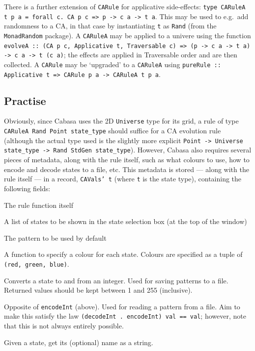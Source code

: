 \documentclass[oneside,a4paper]{memoir}
\begin{document}
There is a further extension of \texttt{CARule} for applicative side-effects:
  \texttt{type CARuleA t p a = forall c. CA p c => p -> c a -> t a}.
This may be used to e.g.\ add randomness to a CA,
  in that case by instantiating \texttt{t} as \texttt{Rand} (from the \texttt{MonadRandom} package).
A \texttt{CARuleA} may be applied to a univere using the function
  \texttt{evolveA :: (CA p c, Applicative t, Traversable c) => (p -> c a -> t a) -> c a -> t (c a)};
  the effects are applied in Traversable order and are then collected.
A \texttt{CARule} may be `upgraded' to a \texttt{CARuleA} using \texttt{pureRule :: Applicative t => CARule p a -> CARuleA t p a}.

\subsection{Practise}
\label{sec:hspr}

Obviously, since Cabasa uses the 2D \texttt{Universe} type for its grid,
  a rule of type \texttt{CARuleA Rand Point state\_type} should suffice for a CA evolution rule
  (although the actual type used is the slightly more explicit
    \texttt{Point -> Universe state\_type -> Rand StdGen state\_type}).
However, Cabasa also requires several pieces of metadata, along with the rule itself,
  such as what colours to use, how to encode and decode states to a file, etc.
This metadata is stored --- along with the rule itself --- in a record, \texttt{CAVals' t}
  (where \texttt{t} is the state type),
  containing the following fields:

\begin{description}[font=\normalfont\bfseries\ttfamily]
\item[\_rule :: Point -> Universe t -> Rand StdGen t]
  The rule function itself
\item[\_states :: {[t]}]
  A list of states to be shown in the state selection box (at the top of the window)
\item[\_defaultPattern :: Universe t]
  The pattern to be used by default
\item[\_state2color :: t -> (Double, Double, Double)]
  A function to specify a colour for each state.
  Colours are specified as a tuple of \texttt{(red, green, blue)}.
\item[\_encodeInt :: t -> Int]
  Converts a state to and from an integer.
  Used for saving patterns to a file.
  Returned values should be kept between 1 and 255 (inclusive).
\item[\_decodeInt :: Int -> t]
  Opposite of \texttt{encodeInt} (above).
  Used for reading a pattern from a file.
  Aim to make this satisfy the law \texttt{(decodeInt . encodeInt) val == val};
    however, note that this is not always entirely possible.
\item[\_getName :: t -> Maybe String]
  Given a state, get its (optional) name as a string.
\end{description}
\end{document}

